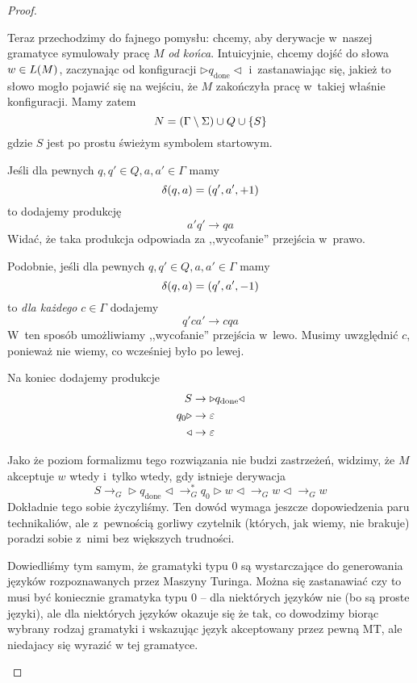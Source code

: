 \begin{proof}
\begin{itemize}
		      Teraz przechodzimy do fajnego pomysłu: chcemy, aby derywacje w~naszej gramatyce symulowały pracę \(M\) \emph{od końca}. Intuicyjnie, chcemy dojść do słowa \(w \in L\pars{M}\), zaczynając od konfiguracji \(\triangleright q_\textrm{done}\triangleleft\) i~zastanawiając się, jakież to słowo mogło pojawić się na wejściu, że \(M\) zakończyła pracę w~takiej właśnie konfiguracji. Mamy zatem
		      \[
			      N = \pars{\Gamma \setminus \Sigma} \cup Q \cup \set{S}
		      \]
		      gdzie \(S\) jest po prostu świeżym symbolem startowym.

		      Jeśli dla pewnych \(q, q' \in Q, a, a' \in \Gamma\) mamy
		      \[
			      \delta\pars{q, a} = \pars{q', a', +1}
		      \]
		      to dodajemy produkcję
		      \[
			      a'q' \rightarrow qa
		      \]
		      Widać, że taka produkcja odpowiada za ,,wycofanie'' przejścia w~prawo.

		      Podobnie, jeśli dla pewnych \(q, q' \in Q, a, a' \in \Gamma\) mamy
		      \[
			      \delta\pars{q, a} = \pars{q', a', -1}
		      \]
		      to \emph{dla każdego} \(c \in \Gamma\) dodajemy
		      \[
			      q'ca' \rightarrow cqa
		      \]
		      W~ten sposób umożliwiamy ,,wycofanie'' przejścia w~lewo. Musimy uwzględnić \(c\), ponieważ nie wiemy, co wcześniej było po lewej.

		      Na koniec dodajemy produkcje
		      \begin{align*}
			      S                 & \rightarrow \triangleright q_\textrm{done}\triangleleft \\
			      q_0\triangleright & \rightarrow \varepsilon                                        \\
			      \triangleleft     & \rightarrow \varepsilon
		      \end{align*}

		      Jako że poziom formalizmu tego rozwiązania nie budzi zastrzeżeń, widzimy, że \(M\) akceptuje \(w\) wtedy i~tylko wtedy, gdy istnieje derywacja
		      \[
			      S \rightarrow_G \triangleright q_\textrm{done} \triangleleft \rightarrow_G^* q_0\triangleright w\triangleleft \rightarrow_G w\triangleleft \rightarrow_G w
		      \]
		      Dokładnie tego sobie życzyliśmy. Ten dowód wymaga jeszcze dopowiedzenia paru technikaliów, ale z~pewnością gorliwy czytelnik (których, jak wiemy, nie brakuje) poradzi sobie z~nimi bez większych trudności.

		      Dowiedliśmy tym samym, że gramatyki typu 0 są wystarczające do generowania języków rozpoznawanych przez Maszyny Turinga.
		      Można się zastanawiać czy to musi być koniecznie gramatyka typu 0 -- dla niektórych języków nie (bo są proste języki), ale dla niektórych języków okazuje się że tak, co dowodzimy biorąc wybrany rodzaj gramatyki i wskazując język akceptowany przez pewną MT, ale niedajacy się wyrazić w tej gramatyce.


	\end{itemize}
\end{proof}
